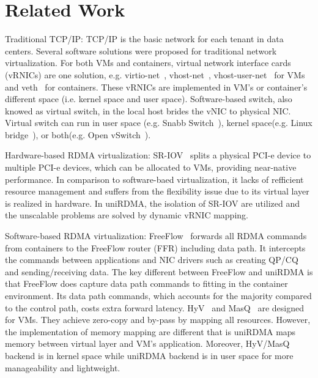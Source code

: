 \section{Related Work}

Traditional TCP/IP: TCP/IP is the basic network for each tenant in data centers. Several software solutions were proposed for traditional network virtualization. For both VMs and containers, virtual network interface cards (vRNICs) are one solution, e.g. virtio-net~\cite{virtio-russell2008}, vhost-net~\cite{vhost-net},  vhost-user-net~\cite{vhost-user-net} for VMs and veth~\cite{veth} for containers. These vRNICs are implemented in VM's or container's different space (i.e. kernel space and user space). Software-based switch, also knowed as virtual switch, in the local host brides the vNIC to physical NIC. Virtual switch can run in user space (e.g. Snabb Switch~\cite{snabb}), kernel space(e.g. Linux bridge~\cite{linux-bridge}), or both(e.g. Open vSwitch~\cite{ovs-2015}). 

Hardware-based RDMA virtualization: SR-IOV~\cite{sr-iov} splits a physical PCI-e device to multiple PCI-e devices, which can be allocated to VMs, providing near-native performance. In comparison to software-baed virtualization, it lacks of refficient resource management and suffers from the flexibility issue due to its virtual layer is realized in hardware. In uniRDMA, the isolation of SR-IOV are utilized and the unscalable problems are solved by dynamic vRNIC mapping. 

Software-based RDMA virtualization: FreeFlow~\cite{kim2019freeflow} forwards all RDMA commands from containers to the FreeFlow router (FFR) including data path. It intercepts the commands between applications and NIC drivers such as creating QP/CQ and sending/receiving data. The key different between FreeFlow and uniRDMA is that FreeFlow does capture data path commands to fitting in the container environment. Its data path commands, which accounts for the majority compared to the control path, costs extra forward latency. HyV~\cite{pfefferle2015hybrid} and MasQ~\cite{he2020masq} are designed for VMs. They achieve zero-copy and by-pass by mapping all resources. However, the implementation of memory mapping are different that is uniRDMA maps memory between virtual layer and VM's application. Moreover, HyV/MasQ backend is in kernel space while uniRDMA backend is in user space for more manageability and lightweight.